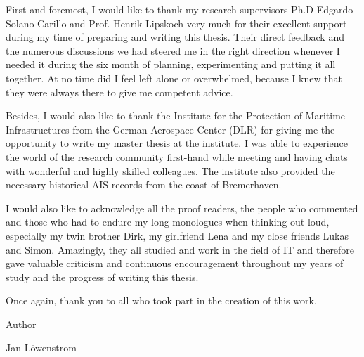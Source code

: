 First and foremost, I would like to thank my research supervisors Ph.D Edgardo Solano Carillo and Prof. Henrik Lipskoch very much for their excellent support during my time of preparing and writing this thesis. Their direct feedback and the numerous discussions we had steered me in the right direction whenever I needed it during the six month of planning, experimenting and putting it all together. At no time did I feel left alone or overwhelmed, because I knew that they were always there to give me competent advice.
\par
Besides, I would also like to thank the Institute for the Protection of Maritime Infrastructures from the German Aerospace Center (DLR) for giving me the opportunity to write my master thesis at the institute. I was able to experience the world of the research community first-hand while meeting and having chats with wonderful and highly skilled colleagues. The institute also provided the necessary historical AIS records from the coast of Bremerhaven.
\par
I would also like to acknowledge all the proof readers, the people who commented and those who had to endure my long monologues when thinking out loud, especially my twin brother Dirk, my girlfriend Lena and my close friends Lukas and Simon. Amazingly, they all studied and work in the field of IT and therefore gave valuable criticism and continuous encouragement throughout my years of study and the progress of writing this thesis.
\par
Once again, thank you to all who took part in the creation of this work.
\par
Author
\par
Jan Löwenstrom